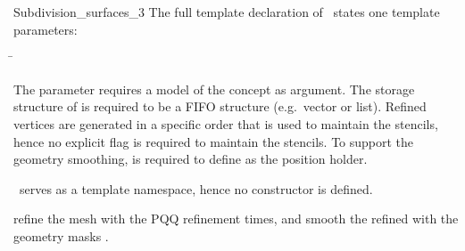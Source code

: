 \begin{ccRefClass}{Subdivision_surfaces_3}
The full template declaration of \ccClassTemplateName\ states one
template parameters:

\begin{tabbing}
 \= 
\end{tabbing}
   
The  parameter requires a model of 
the  concept as argument. The storage structure
of  is required to be a FIFO structure (e.g.~vector or list).
Refined vertices are generated in a specific order that
is used to maintain the stencils, hence no explicit flag is required
to maintain the stencils. To support the geometry smoothing, 
is required to define  as the position holder.








\ccCreation

\ccClassTemplateName\ serves as a template namespace, hence no constructor
is defined. 




\ccThree{}{}{}
{refine the mesh  with the PQQ refinement
 times, and smooth the refined  with the geometry 
masks .}


\end{ccRefClass}
